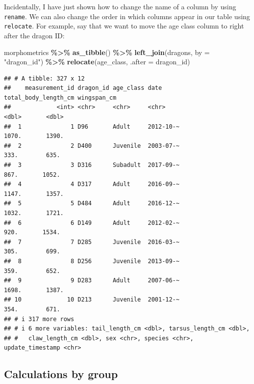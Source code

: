 \documentclass[
]{book}
\newenvironment{Shaded}{\begin{snugshade}}{\end{snugshade}}
\newcommand{\AttributeTok}[1]{\textcolor[rgb]{0.13,0.29,0.53}{#1}}
\newcommand{\FunctionTok}[1]{\textcolor[rgb]{0.13,0.29,0.53}{\textbf{#1}}}
\newcommand{\NormalTok}[1]{#1}
\newcommand{\SpecialCharTok}[1]{\textcolor[rgb]{0.81,0.36,0.00}{\textbf{#1}}}
\newcommand{\StringTok}[1]{\textcolor[rgb]{0.31,0.60,0.02}{#1}}
\begin{document}
Incidentally, I have just shown how to change the name of a column by using
\texttt{rename}. We can also change the order in which columns appear in our table
using \texttt{relocate}. For example, say that we want to move the age class column
to right after the dragon ID:

\begin{Shaded}
\begin{Highlighting}[]
\NormalTok{morphometrics }\SpecialCharTok{\%\textgreater{}\%} 
  \FunctionTok{as\_tibble}\NormalTok{() }\SpecialCharTok{\%\textgreater{}\%} 
  \FunctionTok{left\_join}\NormalTok{(dragons, }\AttributeTok{by =} \StringTok{"dragon\_id"}\NormalTok{) }\SpecialCharTok{\%\textgreater{}\%}  
  \FunctionTok{relocate}\NormalTok{(age\_class, }\AttributeTok{.after =}\NormalTok{ dragon\_id)}
\end{Highlighting}
\end{Shaded}

\begin{verbatim}
## # A tibble: 327 x 12
##    measurement_id dragon_id age_class date      total_body_length_cm wingspan_cm
##             <int> <chr>     <chr>     <chr>                    <dbl>       <dbl>
##  1              1 D96       Adult     2012-10-~                1070.       1390.
##  2              2 D400      Juvenile  2003-07-~                 333.        635.
##  3              3 D316      Subadult  2017-09-~                 867.       1052.
##  4              4 D317      Adult     2016-09-~                1147.       1357.
##  5              5 D484      Adult     2016-12-~                1032.       1721.
##  6              6 D149      Adult     2012-02-~                 920.       1534.
##  7              7 D285      Juvenile  2016-03-~                 305.        699.
##  8              8 D256      Juvenile  2013-09-~                 359.        652.
##  9              9 D283      Adult     2007-06-~                1698.       1387.
## 10             10 D213      Juvenile  2001-12-~                 354.        671.
## # i 317 more rows
## # i 6 more variables: tail_length_cm <dbl>, tarsus_length_cm <dbl>,
## #   claw_length_cm <dbl>, sex <chr>, species <chr>, update_timestamp <chr>
\end{verbatim}

\hypertarget{calculations-by-group}{%
\subsection{Calculations by group}\label{calculations-by-group}}
\end{document}
